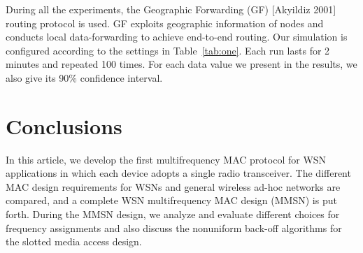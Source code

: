 \documentclass[prodmode,acmtecs]{acmsmall} %
\begin{document}
During all the experiments, the Geographic Forwarding (GF)
[Akyildiz 2001] routing protocol is used. GF exploits geographic
information of nodes and conducts local data-forwarding to achieve
end-to-end routing. Our simulation is
configured according to the settings in
Table~\ref{tab:one}. Each run lasts for 2 minutes and
repeated 100 times. For each data value we present in the results,
we also give its 90\% confidence interval.
\begin{table}%
\begin{tabnote}%
\vskip2pt
\end{tabnote}%
\end{table}%

\section{Conclusions}

In this article, we develop the first multifrequency MAC protocol for
WSN applications in which each device adopts a
single radio transceiver. The different MAC design requirements for
WSNs and general wireless ad-hoc networks are
compared, and a complete WSN multifrequency MAC design (MMSN) is
put forth. During the MMSN design, we analyze and evaluate different
choices for frequency assignments and also discuss the nonuniform
back-off algorithms for the slotted media access design.
\end{document}
